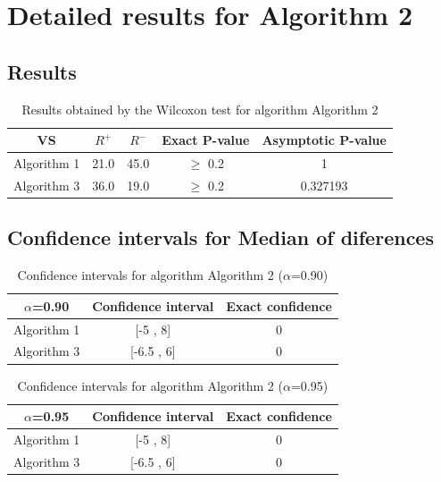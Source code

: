 \documentclass[a4paper,10pt]{article}
\begin{document}
 \clearpage 


\section{Detailed results for Algorithm 2}


\subsection{Results}

\begin{table}[!htp]
\centering\small
\begin{tabular}{
|c|c|c|c|c|}
\hline
 VS & $R^{+}$ & $R^{-}$ & Exact P-value & Asymptotic P-value \\ \hline 
Algorithm 1 & 21.0 & 45.0 & $\geq$ 0.2 & 1\\ \hline 
Algorithm 3 & 36.0 & 19.0 & $\geq$ 0.2 & 0.327193\\ \hline 

\end{tabular}
\caption{Results obtained by the Wilcoxon test for algorithm Algorithm 2}
\end{table}

\subsection{Confidence intervals for Median of diferences}

\begin{table}[!htp]
\centering\small
\begin{tabular}{
|c|c|c|}
\hline
 $\alpha$=0.90 & Confidence interval & Exact confidence \\ \hline 
Algorithm 1 & [-5 , 8] & 0\\ \hline 
Algorithm 3 & [-6.5 , 6] & 0\\ \hline 

\end{tabular}
\caption{Confidence intervals for algorithm Algorithm 2 ($\alpha$=0.90)}
\end{table}
\begin{table}[!htp]
\centering\small
\begin{tabular}{
|c|c|c|}
\hline
 $\alpha$=0.95 & Confidence interval & Exact confidence \\ \hline 
Algorithm 1 & [-5 , 8] & 0\\ \hline 
Algorithm 3 & [-6.5 , 6] & 0\\ \hline 

\end{tabular}
\caption{Confidence intervals for algorithm Algorithm 2 ($\alpha$=0.95)}
\end{table}
\end{document}
